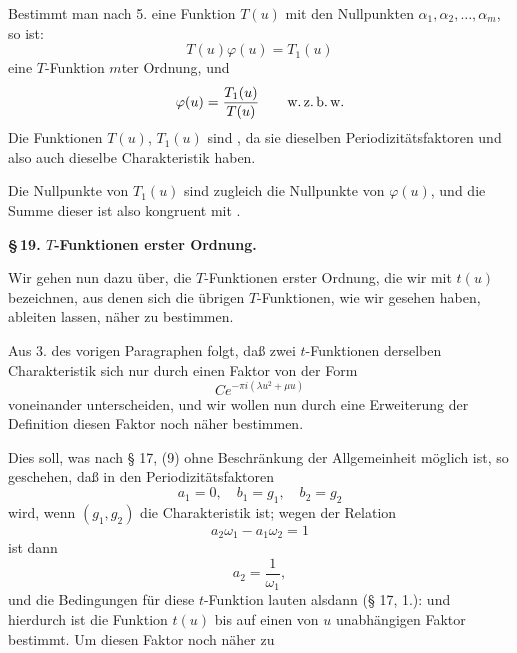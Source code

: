 Bestimmt man nach 5. eine Funktion $T(u)$ mit den Nullpunkten $\alpha_1, \alpha_2, \ldots, \alpha_m$, so ist:
\[
T(u)\varphi(u) = T_1(u)
\]
eine $T$-Funktion $m$ter Ordnung, und
\[
\varphi(u) = \frac{T_1(u)}{T(u)} \qquad \text{w.\,z.\,b.\,w.}
\]
Die Funktionen $T(u)$, $T_1(u)$ sind , da sie dieselben Periodizitätsfaktoren und also auch dieselbe Charakteristik haben.

Die Nullpunkte von $T_1(u)$ sind zugleich die Nullpunkte von $\varphi(u)$, und die Summe dieser  ist also kongruent mit .

\begin{center}
\textbf{\S\,19. $T$-Funktionen erster Ordnung.}
\end{center}

Wir gehen nun dazu über, die $T$-Funktionen erster Ordnung, die wir mit $t(u)$ bezeichnen, aus denen sich die übrigen $T$-Funktionen, wie wir gesehen haben, ableiten lassen, näher zu bestimmen.

Aus 3. des vorigen Paragraphen folgt, daß zwei $t$-Funktionen derselben Charakteristik sich nur durch einen Faktor von der Form
\[
Ce^{-\pi i(\lambda u^2+\mu u)}
\]
voneinander unterscheiden, und wir wollen nun durch eine Erweiterung der Definition diesen Faktor noch näher bestimmen.

Dies soll, was nach § 17, (9) ohne Beschränkung der Allgemeinheit möglich ist, so geschehen, daß in den Periodizitätsfaktoren
\[
a_1 = 0, \quad b_1 = g_1, \quad b_2 = g_2
\]
wird, wenn $(g_1, g_2)$ die Charakteristik ist; wegen der Relation
\[
a_2\omega_1 - a_1\omega_2 = 1
\]
ist dann
\[
a_2 = \frac{1}{\omega_1},
\]
und die Bedingungen für diese $t$-Funktion lauten alsdann (§ 17, 1.):
und hierdurch ist die Funktion $t(u)$ bis auf einen von $u$ unabhängigen Faktor bestimmt. Um diesen Faktor noch näher zu

